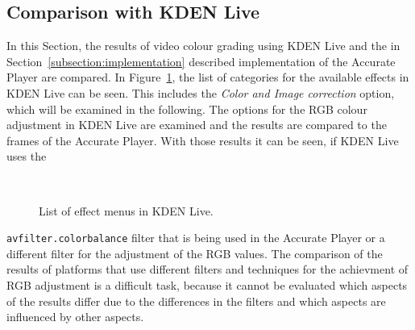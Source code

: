 \documentclass[../MasterThesis.tex]{subfiles}
\begin{document}


\subsection{Comparison with KDEN Live} \label{section:comparisonKDENLive}


\begin{minipage}{0.54\textwidth}
	
	In this Section, the results of video colour grading using KDEN Live and the in Section~\ref{subsection:implementation} described implementation of the Accurate Player are compared. In Figure~\ref{figure:kdenlive_effects}, the list of categories for the available effects in KDEN Live can be seen. This includes the \textit{Color and Image correction} option, which will be examined in the following. The options for the RGB colour adjustment in KDEN Live are examined and the results are compared to the frames of the Accurate Player. With those results it can be seen, if KDEN Live uses the
	
\end{minipage}\begin{minipage}{0.04\textwidth}
	\ 
\end{minipage}\begin{minipage}{0.42\textwidth}
	\begin{figure}[H]
		\begin{center}
			\caption[List of effect menus in KDEN Live.]{List of effect menus in KDEN Live.}
			\label{figure:kdenlive_effects}
		\end{center}
	\end{figure}
	\vfill
\end{minipage}

\vspace*{-0.1em}

\texttt{avfilter.colorbalance} filter that is being used in the Accurate Player or a different filter for the adjustment of the RGB values.
The comparison of the results of platforms that use different filters and techniques for the achievment of RGB adjustment is a difficult task, because it cannot be evaluated which aspects of the results differ due to the differences in the filters and which aspects are influenced by other aspects.
\end{document}
